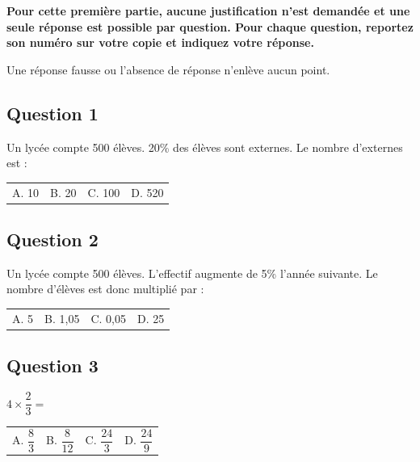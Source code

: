 \textbf{Pour cette première partie, aucune justification n'est demandée et une seule réponse est possible par question. Pour chaque question, reportez son numéro sur votre copie et indiquez votre réponse.}\par
Une réponse fausse ou l'absence de réponse n'enlève aucun point.

\vspace{.8em}

\subsection*{Question 1}

Un lycée compte 500 élèves. 20\% des élèves sont externes. Le nombre d'externes est :
\begin{center}
\begin{tabularx}{.92\linewidth}{XXXX} A. 10 & B. 20 & C. 100 & D. 520\end{tabularx}\end{center}

\vspace{.8em}

\subsection*{Question 2}

Un lycée compte 500 élèves. L'effectif augmente de 5\% l'année suivante. Le nombre d'élèves est donc multiplié par :
\begin{center}
\begin{tabularx}{.92\linewidth}{XXXX} A. 5 & B. 1,05 & C. 0,05 & D. 25\end{tabularx}
\end{center}

\vspace{.8em}

\subsection*{Question 3}

$4\times\dfrac{2}{3}=$
\begin{center}
\begin{tabularx}{.92\linewidth}{XXXX} A. $\dfrac{8}{3}$ & B. $\dfrac{8}{12}$ & C. $\dfrac{24}{3}$ & D. $\dfrac{24}{9}$\end{tabularx}
\end{center}

\vspace{.8em}

